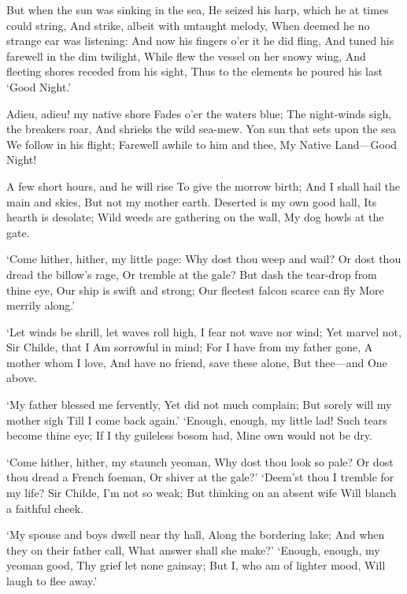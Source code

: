 \documentclass[10pt,twocolumn]{book}
\begin{document}
   But when the sun was sinking in the sea,
   He seized his harp, which he at times could string,
   And strike, albeit with untaught melody,
   When deemed he no strange ear was listening:
   And now his fingers o'er it he did fling,
   And tuned his farewell in the dim twilight,
   While flew the vessel on her snowy wing,
   And fleeting shores receded from his sight,
Thus to the elements he poured his last `Good Night.'

\spatium {1\leading}

\begin{versus}

  \Forma {}
  \Facies          {\strophe}
  \Locus \textus {+2em}

Adieu, adieu! my native shore
   Fades o'er the waters blue;
The night-winds sigh, the breakers roar,
   And shrieks the wild sea-mew.
Yon sun that sets upon the sea
   We follow in his flight;
Farewell awhile to him and thee,
   My Native Land---Good Night!

A few short hours, and he will rise
   To give the morrow birth;
And I shall hail the main and skies,
   But not my mother earth.
Deserted is my own good hall,
   Its hearth is desolate;
Wild weeds are gathering on the wall,
   My dog howls at the gate.

`Come hither, hither, my little page:
   Why dost thou weep and wail?
Or dost thou dread the billow's rage,
   Or tremble at the gale?
But dash the tear-drop from thine eye,
   Our ship is swift and strong;
Our fleetest falcon scarce can fly
   More merrily along.'

`Let winds be shrill, let waves roll high,
   I fear not wave nor wind;
Yet marvel not, Sir Childe, that I
   Am sorrowful in mind;
For I have from my father gone,
   A mother whom I love,
And have no friend, save these alone,
   But thee---and One above.

`My father blessed me fervently,
   Yet did not much complain;
But sorely will my mother sigh
   Till I come back again.'\textemdash
`Enough, enough, my little lad!
   Such tears become thine eye;
If I thy guileless bosom had,
   Mine own would not be dry.

`Come hither, hither, my staunch yeoman,
   Why dost thou look so pale?
Or dost thou dread a French foeman,
   Or shiver at the gale?'\textemdash
`Deem'st thou I tremble for my life?
   Sir Childe, I'm not so weak;
But thinking on an absent wife
   Will blanch a faithful cheek.

`My spouse and boys dwell near thy hall,
   Along the bordering lake;
And when they on their father call,
   What answer shall she make?'\textemdash
`Enough, enough, my yeoman good,
   Thy grief let none gainsay;
But I, who am of lighter mood,
   Will laugh to flee away.'


\end{versus}
\end{document}
